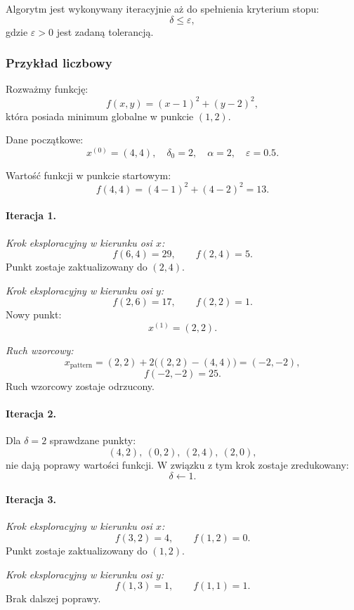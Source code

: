 \documentclass[10pt,a4paper]{article}
\begin{document}
Algorytm jest wykonywany iteracyjnie aż do spełnienia kryterium stopu:
\[
\delta \le \varepsilon,
\]
gdzie $\varepsilon > 0$ jest zadaną tolerancją.



\subsubsection{Przykład liczbowy}

Rozważmy funkcję:
\[
f(x,y) = (x-1)^2 + (y-2)^2,
\]
która posiada minimum globalne w punkcie $(1,2)$.

Dane początkowe:
\[
x^{(0)} = (4,4), \quad \delta_0 = 2, \quad \alpha = 2, \quad \varepsilon = 0.5.
\]

Wartość funkcji w punkcie startowym:
\[
f(4,4) = (4-1)^2 + (4-2)^2 = 13.
\]

\paragraph{Iteracja 1.}

\emph{Krok eksploracyjny w kierunku osi $x$:}
\[
f(6,4) = 29, \qquad f(2,4) = 5.
\]
Punkt zostaje zaktualizowany do $(2,4)$.

\emph{Krok eksploracyjny w kierunku osi $y$:}
\[
f(2,6) = 17, \qquad f(2,2) = 1.
\]
Nowy punkt:
\[
x^{(1)} = (2,2).
\]

\emph{Ruch wzorcowy:}
\[
x_{\text{pattern}} = (2,2) + 2\big((2,2)-(4,4)\big) = (-2,-2),
\]
\[
f(-2,-2) = 25.
\]
Ruch wzorcowy zostaje odrzucony.



\paragraph{Iteracja 2.}

Dla $\delta = 2$ sprawdzane punkty:
\[
(4,2),\ (0,2),\ (2,4),\ (2,0),
\]
nie dają poprawy wartości funkcji.
W związku z tym krok zostaje zredukowany:
\[
\delta \leftarrow 1.
\]



\paragraph{Iteracja 3.}

\emph{Krok eksploracyjny w kierunku osi $x$:}
\[
f(3,2) = 4, \qquad f(1,2) = 0.
\]
Punkt zostaje zaktualizowany do $(1,2)$.

\emph{Krok eksploracyjny w kierunku osi $y$:}
\[
f(1,3) = 1, \qquad f(1,1) = 1.
\]
Brak dalszej poprawy.
\end{document}
